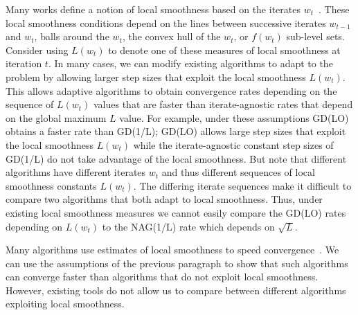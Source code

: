 \documentclass[10pt]{article} %
\begin{document}
Many works define a notion of local smoothness based on the iterates $w_t$~\cite{Zhang2013,Scheinberg2014, grimmer2019convergence,MeiGDSS21,Berahas2023,LuM23,Orabona2023,Mishkin2024}. These local smoothness conditions depend on the lines between successive iterates $w_{t-1}$ and $w_t$, balls around the $w_t$, the convex hull of the $w_t$, or $f(w_t)$ sub-level sets. Consider using $L(w_t)$ to denote one of these measures of local smoothness at iteration $t$. In many cases, we can modify existing algorithms to adapt to the problem by allowing larger step sizes that exploit the local smoothness $L(w_t)$. This allows adaptive algorithms to obtain convergence rates depending on the sequence of $L(w_t)$ values that are faster than iterate-agnostic rates that depend on the global maximum $L$ value. 
For example, under these assumptions GD(LO) obtains a faster rate than GD(1/L); GD(LO) allows large step sizes that exploit the local smoothness $L(w_t)$ while the iterate-agnostic constant step sizes of GD(1/L) do not take advantage of the local smoothness.
But note that different algorithms have different iterates $w_t$ and thus different sequences of local smoothness constants $L(w_t)$. The differing iterate sequences make it difficult to compare two algorithms that both adapt to local smoothness. Thus, under existing local smoothness measures we cannot easily compare the GD(LO) rates depending on $L(w_t)$ to the NAG(1/L) rate which depends on $\sqrt{L}$.

Many algorithms use estimates of local smoothness to speed convergence~\cite{nesterov2013gradient,VainsencherLZ15,SchmidtRB17,fridovich2019choosing,liu2019,MalitskyM20,ParkSW21,patel2022,ShiSLRT23,li2023simple,zhang2024first}. We can use the assumptions of the previous paragraph to show that such algorithms can converge faster than algorithms that do not exploit local smoothness. However, existing tools do not allow us to compare between different algorithms exploiting local smoothness.
\end{document}
